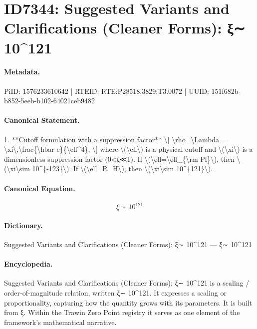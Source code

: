 \section*{ID7344: Suggested Variants and Clarifications (Cleaner Forms): ξ∼ 10\textasciicircum{}121}
\paragraph{Metadata.}
PiID: 1576233610642 | RTEID: RTE:P28518.3829:T3.0072 | UUID: 151f682b-b852-5eeb-b102-64021ceb9482

\paragraph{Canonical Statement.}
1. **Cutoff formulation with a suppression factor** \textbackslash{}[ \textbackslash{}rho\_\textbackslash{}Lambda = \textbackslash{}xi\textbackslash{},\textbackslash{}frac\{\textbackslash{}hbar c\}\{\textbackslash{}ell\textasciicircum{}4\}, \textbackslash{}] where \textbackslash{}(\textbackslash{}ell\textbackslash{}) is a physical cutoff and \textbackslash{}(\textbackslash{}xi\textbackslash{}) is a dimensionless suppression factor (0<ξ≪1). If \textbackslash{}(\textbackslash{}ell=\textbackslash{}ell\_\{\textbackslash{}rm Pl\}\textbackslash{}), then \textbackslash{}(\textbackslash{}xi\textbackslash{}sim 10\textasciicircum{}\{-123\}\textbackslash{}). If \textbackslash{}(\textbackslash{}ell=R\_H\textbackslash{}), then \textbackslash{}(\textbackslash{}xi\textbackslash{}sim 10\textasciicircum{}\{121\}\textbackslash{}).

\paragraph{Canonical Equation.}
\[
\xi\sim 10^{121}
\]

\paragraph{Dictionary.}
Suggested Variants and Clarifications (Cleaner Forms): ξ∼ 10\textasciicircum{}121 — ξ∼ 10\textasciicircum{}121

\paragraph{Encyclopedia.}
Suggested Variants and Clarifications (Cleaner Forms): ξ∼ 10\textasciicircum{}121 is a scaling / order-of-magnitude relation, written ξ∼ 10\textasciicircum{}121. It expresses a scaling or proportionality, capturing how the quantity grows with its parameters. It is built from ξ. Within the Trawin Zero Point registry it serves as one element of the framework's mathematical narrative.
